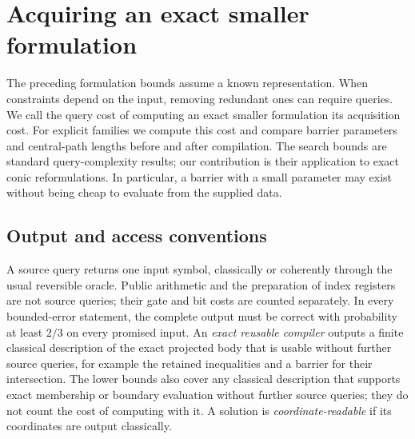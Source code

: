 \section{Acquiring an exact smaller formulation}
\label{active:section}

The preceding formulation bounds assume a known representation. When
constraints depend on the input, removing redundant ones can require
queries. We call the query cost of computing an exact smaller
formulation its acquisition cost. For explicit families we compute this
cost and compare barrier parameters and central-path lengths before and
after compilation. The search bounds are standard query-complexity
results; our contribution is their application to exact conic
reformulations. In particular, a barrier with a small parameter may
exist without being cheap to evaluate from the supplied data.

\subsection{Output and access conventions}

A source query returns one input symbol, classically or coherently through the usual reversible oracle. Public arithmetic
and the preparation of index registers are not source queries; their
gate and bit costs are counted separately. In every bounded-error
statement, the complete output must be correct with probability at
least $2/3$ on every promised input.
An \emph{exact reusable compiler} outputs a finite classical description
of the exact projected body that is usable without further source
queries, for example the retained inequalities and a barrier for their
intersection. The lower bounds also cover any classical
description that supports exact membership or boundary evaluation
without further source queries; they do not count the cost of
computing with it. A solution is
\emph{coordinate-readable} if its coordinates are output classically.

